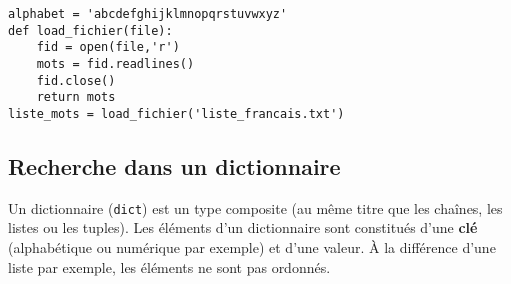 \begin{lstlisting}
alphabet = 'abcdefghijklmnopqrstuvwxyz'
def load_fichier(file):
    fid = open(file,'r')
    mots = fid.readlines()
    fid.close()
    return mots
liste_mots = load_fichier('liste_francais.txt')
\end{lstlisting}




%
%


\subsection*{Recherche dans un dictionnaire}

Un dictionnaire (\texttt{dict}) est un type composite (au même titre que les chaînes, les listes ou les tuples). Les éléments d'un dictionnaire sont constitués d'une \textbf{clé} (alphabétique ou numérique par exemple) et d'une valeur. À la différence d'une liste par exemple, les éléments ne sont pas ordonnés.

